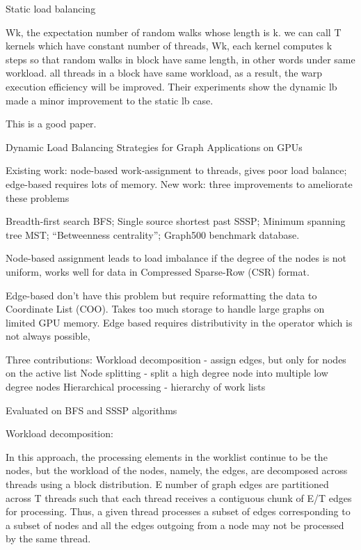 \documentclass{article}
\begin{document}
Static load balancing

Wk, the expectation number of random walks whose length is k. we can call T kernels which have constant number of threads, Wk, each kernel computes k steps so that random walks in block have same length, in other words under same workload.   
all threads in a block have same workload, as a result, the warp execution efficiency will be improved. 
Their experiments show the dynamic lb made a minor improvement to the static lb case.

This is a good paper.





\cite{dlbgraphgpu}


Dynamic Load Balancing Strategies for Graph Applications on GPUs 

Existing work: node-based work-assignment to threads, gives poor load balance; edge-based requires lots of memory.
New work: three improvements to ameliorate these problems

Breadth-first search BFS;
Single source shortest past SSSP;
Minimum spanning tree MST;
“Betweenness centrality”;
Graph500 benchmark database.

Node-based assignment leads to load imbalance if the degree of the nodes is not uniform, works well for data in Compressed Sparse-Row (CSR) format.

Edge-based don’t have this problem but require reformatting the data to Coordinate List (COO).  Takes too much storage to handle large graphs on limited GPU memory.
Edge based requires distributivity in the operator which is not always possible,

Three contributions:
Workload decomposition - assign edges, but only for nodes on the active list
Node splitting - split a high degree node into multiple low degree nodes
Hierarchical processing - hierarchy of work lists

Evaluated on BFS and SSSP algorithms

Workload decomposition:

In this approach, the processing elements in the worklist continue to be the nodes, but the workload of the nodes, namely, the edges, are decomposed across threads using a block distribution. E number of graph edges are partitioned across T threads such that each thread receives a contiguous chunk of E/T edges for processing. Thus, a given thread processes a subset of edges corresponding to a subset of nodes and all the edges outgoing from a node may not be processed by the same thread. 
\end{document}

